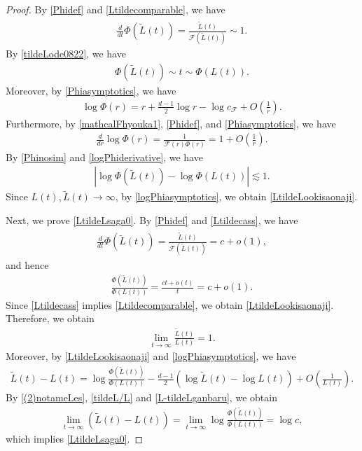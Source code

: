 \documentclass[10pt,a4paper]{amsart}
\numberwithin{equation}{section}
\begin{document}
\begin{proof}
By \eqref{Phidef} and \eqref{Ltildecomparable}, we have
\begin{align}\label{tildeLode0822}
\frac{d}{dt}\Phi(\tilde{L}(t))=\frac{\dot{\tilde{L}}(t)}{\mathcal{F}(\tilde{L}(t))}\sim1.
\end{align}
By \eqref{tildeLode0822}, we have
\begin{align}\label{Phinosim}
\Phi(\tilde{L}(t))\sim t\sim \Phi(L(t)).
\end{align}
Moreover, by \eqref{Phiasymptotics}, we have
\begin{align}\label{logPhiasymptotics}
\log{\Phi(r)}=r+\frac{d-1}{2}\log{r}-\log{c_{\mathcal{F}}}+O\left(\frac{1}{r}\right).
\end{align}
Furthermore, by \eqref{mathcalFhyouka1}, \eqref{Phidef}, and \eqref{Phiasymptotics}, we have
\begin{align}\label{logPhiderivative}
\frac{d}{dr}\log{\Phi(r)}=\frac{1}{\mathcal{F}(r)\Phi(r)}=1+O\left(\frac{1}{r}\right).
\end{align}
By \eqref{Phinosim} and \eqref{logPhiderivative}, we have
\begin{align*}
\left|\log{\Phi(\tilde{L}(t))}-\log{\Phi(L(t))}\right|\lesssim1.
\end{align*}
Since $L(t),\tilde{L}(t)\to\infty$, by \eqref{logPhiasymptotics}, we obtain \eqref{LtildeLookisaonaji}.

Next, we prove \eqref{LtildeLsaga0}. By \eqref{Phidef} and \eqref{Ltildecass}, we have
\begin{align*}
\frac{d}{dt}\Phi(\tilde{L}(t))=\frac{\dot{\tilde{L}}(t)}{\mathcal{F}(\tilde{L}(t))}=c+o(1),
\end{align*}
and hence
\begin{align}\label{(2)notameLes}
\frac{\Phi(\tilde{L}(t))}{\Phi(L(t))}=\frac{ct+o(t)}{t}=c+o(1).
\end{align}
Since \eqref{Ltildecass} implies \eqref{Ltildecomparable}, we obtain \eqref{LtildeLookisaonaji}. Therefore, we obtain
\begin{align}\label{tildeL/L}
\lim_{t\to\infty}\frac{\tilde{L}(t)}{L(t)}=1.
\end{align}
Moreover, by \eqref{LtildeLookisaonaji} and \eqref{logPhiasymptotics}, we have
\begin{align}\label{L-tildeLganbaru}
\tilde{L}(t)-L(t)=\log{{\frac{\Phi(\tilde{L}(t))}{\Phi(L(t))}}}-\frac{d-1}{2}\left(\log{\tilde{L}(t)}-\log{L(t)}\right)+O\left(\frac{1}{L(t)}\right).
\end{align}
By \eqref{(2)notameLes}, \eqref{tildeL/L} and \eqref{L-tildeLganbaru}, we obtain
\begin{align*}
\lim_{t\to\infty}\left(\tilde{L}(t)-L(t)\right)=\lim_{t\to\infty}\log{\frac{\Phi(\tilde{L}(t))}{\Phi(L(t))}}=\log{c},
\end{align*}
which implies \eqref{LtildeLsaga0}.
\end{proof}
\end{document}
